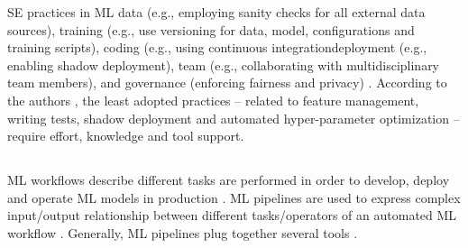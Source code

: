 \DIFdelbegin {}\DIFdelend %
\DIFaddbegin 

\DIFaddend SE practices in ML \DIFdelbegin {}\DIFdelend \DIFaddbegin {}\DIFaddend data (e.g., employing sanity checks for all external data sources), \DIFdelbegin {}\DIFdelend training (e.g., use versioning for data, model, configurations and training scripts), \DIFdelbegin {}\DIFdelend coding (e.g., using continuous integration\DIFdelbegin {}\DIFdelend \DIFaddbegin \DIFadd{, }\DIFaddend deployment (e.g., enabling shadow deployment), \DIFdelbegin {}\DIFdelend team (e.g., collaborating with multidisciplinary team members), and \DIFdelbegin {}\DIFdelend governance (enforcing fairness and privacy) \cite{Serban2020Practices}. According to the authors \cite{Serban2020Practices}, the least adopted practices -- related to feature management, writing tests, shadow deployment and automated hyper-parameter optimization -- require effort, knowledge and tool support. 
\DIFdelbegin {}\DIFdelend 

\DIFdelbegin \subsection{}
\addtocounter{subsection}{-1}%
\DIFdelend %

\DIFaddbegin \subsection{}

\DIFaddend ML workflows describe different tasks \DIFdelbegin {}\DIFdelend \DIFaddbegin {}\DIFaddend are performed in order to develop, deploy and operate ML models in production \cite{Amershi2019}. ML pipelines are used to express \DIFdelbegin {}\DIFdelend complex input/output relationship between 
\DIFdelbegin {}\DIFdelend different tasks/operators of an automated ML workflow \cite{Doris2021MLPipelines}. Generally, ML pipelines plug together several tools \DIFdelbegin {}\DIFdelend \DIFaddbegin {}\DIFaddend \cite{Hummer2019IBM}.

